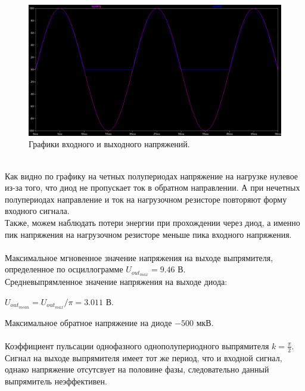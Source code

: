 \documentclass[12pt]{article}
\begin{document}
\begin{figure}[H]
    \centering
    \includegraphics[width=\textwidth]{2_voltages.png}
    \caption{Графики входного и выходного напряжений.}
    \label{fig:2_voltages.png}
\end{figure}\\
Как видно по графику на четных полупериодах напряжение на нагрузке нулевое из-за того, что диод не пропускает ток в обратном направлении. А при нечетных полупериодах направление и ток на нагрузочном резисторе повторяют форму входного сигнала.\\
Также, можем наблюдать потери энергии при прохождении через диод, а именно пик напряжения на нагрузочном резисторе меньше пика входного напряжения.\\
\ \\
Максимальное мгновенное значение напряжения на выходе выпрямителя, определенное по осциллограмме $U_{out_{max}} = 9.46$ В.\\
Средневыпрямленное значение напряжения на выходе диода:
\begin{center}
    $U_{out_{mean}} = U_{out_{max}} / \pi = 3.011$ В.
\end{center}
Максимальное обратное напряжение на диоде $-500$ мкВ.\\
\ \\
Коэффициент пульсации однофазного однополупериодного выпрямителя $k = \frac{\pi}{2}$.\\
Сигнал на выходе выпрямителя имеет тот же период, что и входной сигнал, однако напряжение отсутсвует на половине фазы, следовательно данный выпрямитель неэффективен.
\end{document}

